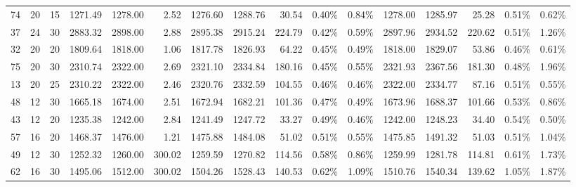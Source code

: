 \begin{tabular}{lllrrrrrrllrrrll}
74 &  20 &  15 &   1271.49 &    1278.00 &        2.52 &       1276.60 &        1288.76 &           30.54 &            0.40\% &             0.84\% &       1278.00 &        1285.97 &           25.28 &            0.51\% &             0.62\% \\
37 &  24 &  30 &   2883.32 &    2898.00 &        2.88 &       2895.38 &        2915.24 &          224.79 &            0.42\% &             0.59\% &       2897.96 &        2934.52 &          220.62 &            0.51\% &             1.26\% \\
32 &  20 &  20 &   1809.64 &    1818.00 &        1.06 &       1817.78 &        1826.93 &           64.22 &            0.45\% &             0.49\% &       1818.00 &        1829.07 &           53.86 &            0.46\% &             0.61\% \\
75 &  20 &  30 &   2310.74 &    2322.00 &        2.69 &       2321.10 &        2334.84 &          180.16 &            0.45\% &             0.55\% &       2321.93 &        2367.56 &          181.30 &            0.48\% &             1.96\% \\
13 &  20 &  25 &   2310.22 &    2322.00 &        2.46 &       2320.76 &        2332.59 &          104.55 &            0.46\% &             0.46\% &       2322.00 &        2334.77 &           87.16 &            0.51\% &             0.55\% \\
48 &  12 &  30 &   1665.18 &    1674.00 &        2.51 &       1672.94 &        1682.21 &          101.36 &            0.47\% &             0.49\% &       1673.96 &        1688.37 &          101.66 &            0.53\% &             0.86\% \\
43 &  12 &  20 &   1235.38 &    1242.00 &        2.84 &       1241.49 &        1247.72 &           33.27 &            0.49\% &             0.46\% &       1242.00 &        1248.23 &           34.40 &            0.54\% &             0.50\% \\
57 &  16 &  20 &   1468.37 &    1476.00 &        1.21 &       1475.88 &        1484.08 &           51.02 &            0.51\% &             0.55\% &       1475.85 &        1491.32 &           51.03 &            0.51\% &             1.04\% \\
49 &  12 &  30 &   1252.32 &    1260.00 &      300.02 &       1259.59 &        1270.82 &          114.56 &            0.58\% &             0.86\% &       1259.99 &        1281.78 &          114.81 &            0.61\% &             1.73\% \\
62 &  16 &  30 &   1495.06 &    1512.00 &      300.02 &       1504.26 &        1528.43 &          140.53 &            0.62\% &             1.09\% &       1510.76 &        1540.34 &          139.62 &            1.05\% &             1.87\% \\

\end{tabular}
